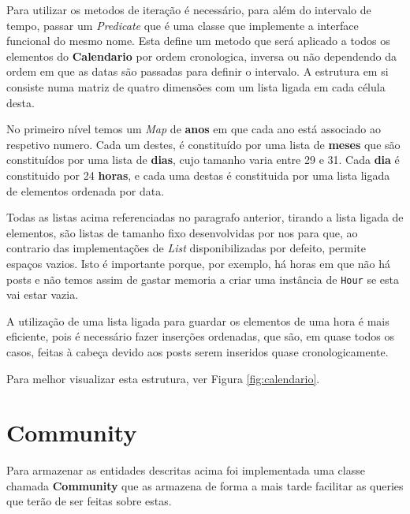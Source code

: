 \documentclass[10pt,a4paper]{report}
\begin{document}
        Para utilizar os metodos de iteração é necessário, para além do intervalo
        de tempo, passar um \textit{Predicate} que é uma classe que
        implemente a interface funcional do mesmo nome. Esta define um metodo que
        será aplicado a todos os elementos do \textbf{Calendario} por ordem
        cronologica, inversa ou não dependendo da ordem em que as datas são
        passadas para definir o intervalo.
        A estrutura em si consiste numa matriz de quatro dimensões com um lista
        ligada em cada célula desta.

        No primeiro nível temos um \textit{Map} de \textbf{anos} em que cada ano
        está associado ao respetivo numero. Cada um destes, é constituído por uma
        lista de \textbf{meses} que são constituídos por uma lista de
        \textbf{dias}, cujo tamanho varia entre 29 e 31. Cada \textbf{dia} é
        constituido por 24 \textbf{horas}, e cada uma destas é constituida por
        uma lista ligada de elementos ordenada por data.

        Todas as listas acima referenciadas no paragrafo anterior, tirando a lista
        ligada de elementos, são listas de tamanho fixo desenvolvidas por nos %
        para que, ao contrario das implementações de \textit{List} disponibilizadas
        por defeito, permite espaços vazios. Isto é importante porque, por exemplo,
        há horas em que não há posts e não temos assim de gastar memoria a criar
        uma instância de \texttt{Hour} se esta vai estar vazia.

        A utilização de uma lista ligada para guardar os elementos de uma hora é
        mais eficiente, pois é necessário fazer inserções ordenadas, que são, em
        quase todos os casos, feitas à cabeça devido aos posts serem inseridos
        quase cronologicamente.

        Para melhor visualizar esta estrutura, ver Figura \ref{fig:calendario}.

    \section{Community}
    Para armazenar as entidades descritas acima foi implementada uma classe
    chamada \textbf{Community} que as armazena de forma a mais tarde facilitar
    as queries que terão de ser feitas sobre estas.
\end{document}
